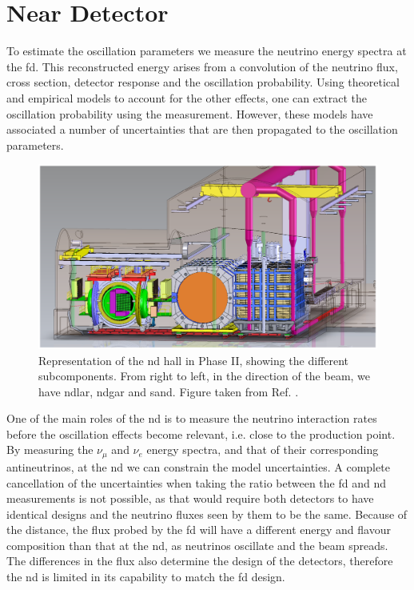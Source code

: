 \section{Near Detector}

To estimate the oscillation parameters we measure the neutrino energy spectra at the \gls{fd}. This reconstructed energy arises from a convolution of the neutrino flux, cross section, detector response and the oscillation probability. Using theoretical and empirical models to account for the other effects, one can extract the oscillation probability using the measurement. However, these models have associated a number of uncertainties that are then propagated to the oscillation parameters.

\begin{figure}[t]
	\centering
	\includegraphics[width=0.95\linewidth]{Images/DUNE/ND/nd_hall}
	\caption[Representation of the \gls{nd} hall in Phase II.]{Representation of the \gls{nd} hall in Phase II, showing the different subcomponents. From right to left, in the direction of the beam, we have \gls{ndlar}, \gls{ndgar} and \gls{sand}. Figure taken from Ref. \cite{DUNE2021NDCDR}.}
	\label{fig:dune_nd}
\end{figure}

One of the main roles of the \gls{nd} is to measure the neutrino interaction rates before the oscillation effects become relevant, i.e. close to the production point. By measuring the $\nu_{\mu}$ and $\nu_{e}$ energy spectra, and that of their corresponding antineutrinos, at the \gls{nd} we can constrain the model uncertainties. A complete cancellation of the uncertainties when taking the ratio between the \gls{fd} and \gls{nd} measurements is not possible, as that would require both detectors to have identical designs and the neutrino fluxes seen by them to be the same. Because of the distance, the flux probed by the \gls{fd} will have a different energy and flavour composition than that at the \gls{nd}, as neutrinos oscillate and the beam spreads. The differences in the flux also determine the design of the detectors, therefore the \gls{nd} is limited in its capability to match the \gls{fd} design.

